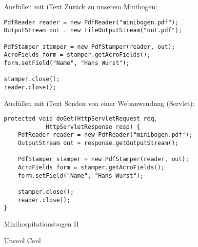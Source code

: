 \documentclass{beamer}
\begin{document}
\begin{frame}[fragile]{Ausfüllen mit iText}
Zurück zu unserem Minibogen:

\bigskip

\begin{verbatim}
PdfReader reader = new PdfReader("minibogen.pdf");
OutputStream out = new FileOutputStream("out.pdf");

PdfStamper stamper = new PdfStamper(reader, out);
AcroFields form = stamper.getAcroFields();
form.setField("Name", "Hans Wurst");

stamper.close();
reader.close();
\end{verbatim}
\end{frame}

\begin{frame}[fragile]{Ausfüllen mit iText}
Senden von einer Webanwendung (Servlet):

\bigskip

\begin{verbatim}
protected void doGet(HttpServletRequest req,
            HttpServletResponse resp) {
    PdfReader reader = new PdfReader("minibogen.pdf");
    OutputStream out = response.getOutputStream();

    PdfStamper stamper = new PdfStamper(reader, out);
    AcroFields form = stamper.getAcroFields();
    form.setField("Name", "Hans Wurst");

    stamper.close();
    reader.close();
}
\end{verbatim}
\end{frame}


\begin{frame}{Minihospitationsbogen II}
	\begin{framed}
		\begin{Form}

		    \hrulefill

    		\begin{center}
			    \Huge Uncool\hspace{0.5em}
		    	\large
			    \Huge \hspace{0.5em} Cool
		    \end{center}
    		\smallskip
		\end{Form}
	\end{framed}
\end{frame}
\end{document}
